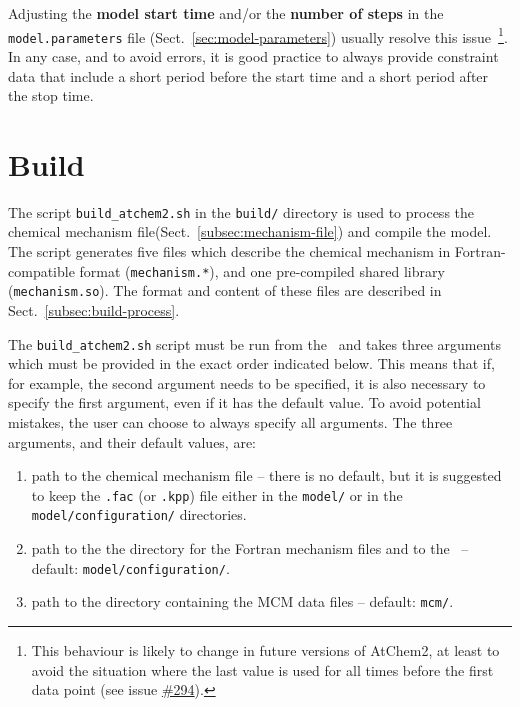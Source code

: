 Adjusting the \textbf{model start time} and/or the \textbf{number of steps}
in the \texttt{model.parameters} file (Sect.~\ref{sec:model-parameters})
usually resolve this issue~\footnote{This behaviour is likely to change
  in future versions of AtChem2, at least to avoid the situation where
  the last value is used for all times before the first data point
  (see issue \href{https://github.com/AtChem/AtChem2/issues/294}{\#294}).}.
In any case, and to avoid errors, it is good practice to always
provide constraint data that include a short period before the start
time and a short period after the stop time.

\section{Build} \label{sec:build}

The script \texttt{build\_atchem2.sh} in the \texttt{build/} directory is
used to process the chemical mechanism file(Sect.~\ref{subsec:mechanism-file})
and compile the model. The script generates five files which describe
the chemical mechanism in Fortran-compatible format
(\texttt{mechanism.*}), and one pre-compiled shared library
(\texttt{mechanism.so}). The format and content of these files are
described in Sect.~\ref{subsec:build-process}.

The \texttt{build\_atchem2.sh} script must be run from the \maindir\
and takes three arguments which must be provided in the exact order
indicated below. This means that if, for example, the second argument
needs to be specified, it is also necessary to specify the first
argument, even if it has the default value. To avoid potential
mistakes, the user can choose to always specify all arguments. The
three arguments, and their default values, are:

\begin{enumerate}
\item path to the chemical mechanism file -- there is no default, but
  it is suggested to keep the \texttt{.fac} (or \texttt{.kpp}) file
  either in the \texttt{model/} or in the
  \texttt{model/configuration/} directories.
\item path to the the directory for the Fortran mechanism files and to
  the \sharedir\ -- default: \texttt{model/configuration/}.
\item path to the directory containing the MCM data files -- default:
  \texttt{mcm/}.
\end{enumerate}

